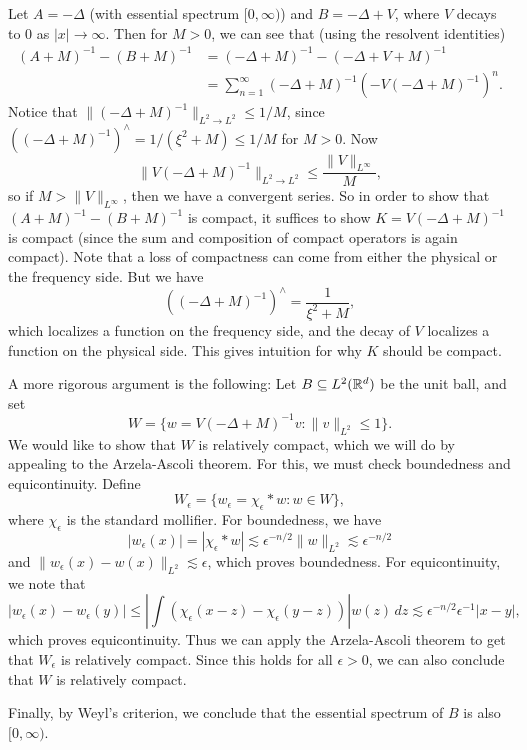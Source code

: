 \begin{example}
  Let $A = -\Delta$ (with essential spectrum
  $[0, \infty)$)
  and $B = -\Delta + V$, where $V$ decays to
  $0$ as $|x| \to \infty$. Then for $M > 0$,
  we can see that (using
  the resolvent identities)
  \begin{align*}
    (A + M)^{-1} - (B + M)^{-1}
    &= (-\Delta + M)^{-1} - (-\Delta + V + M)^{-1} \\
    &= \sum_{n = 1}^\infty (-\Delta + M)^{-1}
    (-V(-\Delta + M)^{-1})^n.
  \end{align*}
  Notice that $\|(-\Delta + M)^{-1}\|_{L^2 \to L^2} \le 1 / M$,
  since
  $((-\Delta + M)^{-1})^\wedge = 1 / (\xi^2 + M) \le 1 / M$
  for $M > 0$. Now
  \[
    \|V(-\Delta + M)^{-1}\|_{L^2 \to L^2} \le \frac{\|V\|_{L^\infty}}{M},
  \]
  so if $M > \|V\|_{L^\infty}$, then
  we have a convergent series. So in order to show
  that $(A + M)^{-1} - (B + M)^{-1}$ is compact, it
  suffices to show $K = V(-\Delta + M)^{-1}$ is compact
  (since the sum and composition of compact operators
  is again compact). Note that a loss of compactness
  can come from either the physical or the frequency
  side. But we have
  \[
    ((-\Delta + M)^{-1})^\wedge = \frac{1}{\xi^2 + M},
  \]
  which localizes a function on the frequency side,
  and the decay of $V$ localizes a function on the
  physical side. This gives intuition for why
  $K$ should be compact.

  A more rigorous argument is the following: Let
  $B \subseteq L^2(\mathbb{R}^d)$ be the unit ball, and set
  \[
    W = \{w = V(-\Delta + M)^{-1} v : \|v\|_{L^2} \le 1\}.
  \]
  We would like to show that $W$ is relatively compact,
  which we will do by appealing to the Arzela-Ascoli
  theorem. For this, we must check boundedness and
  equicontinuity. Define
  \[
    W_\epsilon = \{w_\epsilon = \chi_\epsilon * w : w \in W\},
  \]
  where $\chi_\epsilon$ is the standard mollifier.
  For boundedness, we have
  \[
    |w_\epsilon(x)| = |\chi_\epsilon * w|
    \lesssim \epsilon^{-n / 2} \|w\|_{L^2}
    \lesssim \epsilon^{-n / 2}
  \]
  and $\|w_\epsilon(x) - w(x)\|_{L^2} \lesssim \epsilon$,
  which proves boundedness. For
  equicontinuity, we note that
  \[
    |w_\epsilon(x) - w_\epsilon(y)|
    \le \left|\int (\chi_\epsilon(x - z) - \chi_\epsilon(y - z))\right| w(z)\, dz
    \lesssim \epsilon^{-n / 2} \epsilon^{-1} |x - y|,
  \]
  which proves equicontinuity. Thus we can apply
  the Arzela-Ascoli theorem to get that $W_\epsilon$ is
  relatively compact. Since this holds for all
  $\epsilon > 0$, we can also conclude that
  $W$ is relatively compact.

  Finally, by Weyl's criterion, we conclude that
  the essential spectrum of $B$ is also $[0, \infty)$.
\end{example}
